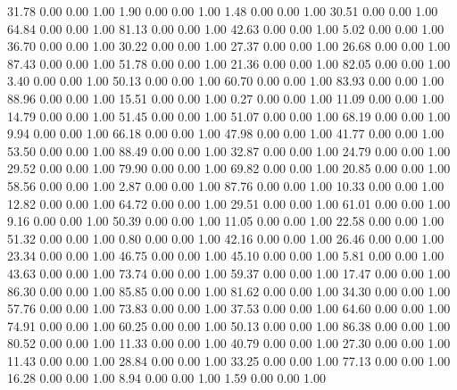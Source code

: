    31.78   0.00   0.00   1.00
    1.90   0.00   0.00   1.00
    1.48   0.00   0.00   1.00
   30.51   0.00   0.00   1.00
   64.84   0.00   0.00   1.00
   81.13   0.00   0.00   1.00
   42.63   0.00   0.00   1.00
    5.02   0.00   0.00   1.00
   36.70   0.00   0.00   1.00
   30.22   0.00   0.00   1.00
   27.37   0.00   0.00   1.00
   26.68   0.00   0.00   1.00
   87.43   0.00   0.00   1.00
   51.78   0.00   0.00   1.00
   21.36   0.00   0.00   1.00
   82.05   0.00   0.00   1.00
    3.40   0.00   0.00   1.00
   50.13   0.00   0.00   1.00
   60.70   0.00   0.00   1.00
   83.93   0.00   0.00   1.00
   88.96   0.00   0.00   1.00
   15.51   0.00   0.00   1.00
    0.27   0.00   0.00   1.00
   11.09   0.00   0.00   1.00
   14.79   0.00   0.00   1.00
   51.45   0.00   0.00   1.00
   51.07   0.00   0.00   1.00
   68.19   0.00   0.00   1.00
    9.94   0.00   0.00   1.00
   66.18   0.00   0.00   1.00
   47.98   0.00   0.00   1.00
   41.77   0.00   0.00   1.00
   53.50   0.00   0.00   1.00
   88.49   0.00   0.00   1.00
   32.87   0.00   0.00   1.00
   24.79   0.00   0.00   1.00
   29.52   0.00   0.00   1.00
   79.90   0.00   0.00   1.00
   69.82   0.00   0.00   1.00
   20.85   0.00   0.00   1.00
   58.56   0.00   0.00   1.00
    2.87   0.00   0.00   1.00
   87.76   0.00   0.00   1.00
   10.33   0.00   0.00   1.00
   12.82   0.00   0.00   1.00
   64.72   0.00   0.00   1.00
   29.51   0.00   0.00   1.00
   61.01   0.00   0.00   1.00
    9.16   0.00   0.00   1.00
   50.39   0.00   0.00   1.00
   11.05   0.00   0.00   1.00
   22.58   0.00   0.00   1.00
   51.32   0.00   0.00   1.00
    0.80   0.00   0.00   1.00
   42.16   0.00   0.00   1.00
   26.46   0.00   0.00   1.00
   23.34   0.00   0.00   1.00
   46.75   0.00   0.00   1.00
   45.10   0.00   0.00   1.00
    5.81   0.00   0.00   1.00
   43.63   0.00   0.00   1.00
   73.74   0.00   0.00   1.00
   59.37   0.00   0.00   1.00
   17.47   0.00   0.00   1.00
   86.30   0.00   0.00   1.00
   85.85   0.00   0.00   1.00
   81.62   0.00   0.00   1.00
   34.30   0.00   0.00   1.00
   57.76   0.00   0.00   1.00
   73.83   0.00   0.00   1.00
   37.53   0.00   0.00   1.00
   64.60   0.00   0.00   1.00
   74.91   0.00   0.00   1.00
   60.25   0.00   0.00   1.00
   50.13   0.00   0.00   1.00
   86.38   0.00   0.00   1.00
   80.52   0.00   0.00   1.00
   11.33   0.00   0.00   1.00
   40.79   0.00   0.00   1.00
   27.30   0.00   0.00   1.00
   11.43   0.00   0.00   1.00
   28.84   0.00   0.00   1.00
   33.25   0.00   0.00   1.00
   77.13   0.00   0.00   1.00
   16.28   0.00   0.00   1.00
    8.94   0.00   0.00   1.00
    1.59   0.00   0.00   1.00
